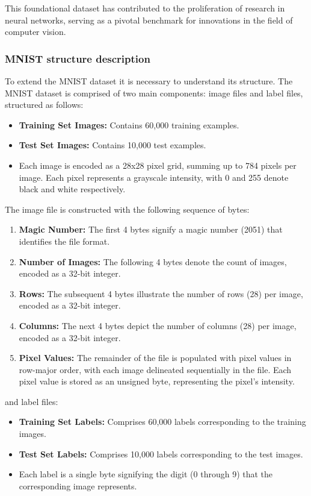 This foundational dataset has contributed to the proliferation of research in neural networks, serving as a pivotal benchmark for innovations in the field of computer vision.


\subsubsection{MNIST structure description}

To extend the MNIST dataset it is necessary to understand its structure. The MNIST dataset is comprised of two main components: image files and label files, structured as follows:

\begin{itemize}
    \item \textbf{Training Set Images:} Contains 60,000 training examples.
    \item \textbf{Test Set Images:} Contains 10,000 test examples.
    \item Each image is encoded as a 28x28 pixel grid, summing up to 784 pixels per image. Each pixel represents a grayscale intensity, with 0 and 255 denote black and white respectively.
\end{itemize}

The image file is constructed with the following sequence of bytes:
\begin{enumerate}
    \item \textbf{Magic Number:} The first 4 bytes signify a magic number (2051) that identifies the file format.
    \item \textbf{Number of Images:} The following 4 bytes denote the count of images, encoded as a 32-bit integer.
    \item \textbf{Rows:} The subsequent 4 bytes illustrate the number of rows (28) per image, encoded as a 32-bit integer.
    \item \textbf{Columns:} The next 4 bytes depict the number of columns (28) per image, encoded as a 32-bit integer.
    \item \textbf{Pixel Values:} The remainder of the file is populated with pixel values in row-major order, with each image delineated sequentially in the file. Each pixel value is stored as an unsigned byte, representing the pixel's intensity.
\end{enumerate}

and label files:

\begin{itemize}
    \item \textbf{Training Set Labels:} Comprises 60,000 labels corresponding to the training images.
    \item \textbf{Test Set Labels:} Comprises 10,000 labels corresponding to the test images.
    \item Each label is a single byte signifying the digit (0 through 9) that the corresponding image represents.
\end{itemize}

